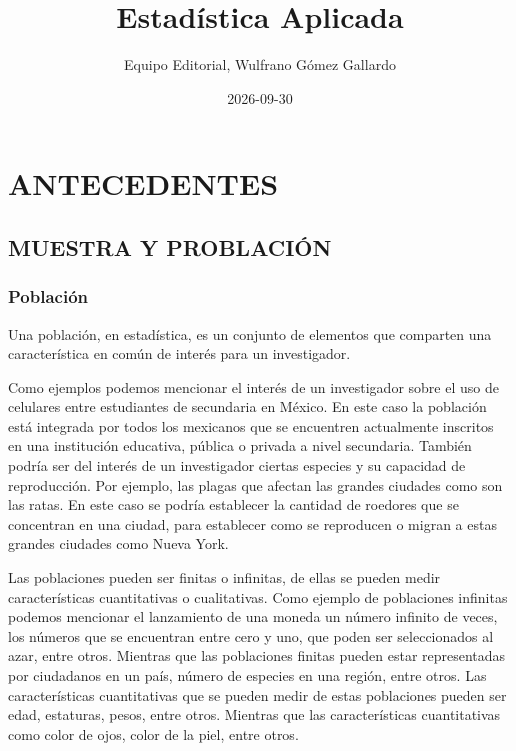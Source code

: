 \documentclass[
  oneside]{book}
\title{Estadística Aplicada}
\author{Equipo Editorial, Wulfrano Gómez Gallardo}
\date{2026-09-30}
\begin{document}
\maketitle

{
\setcounter{tocdepth}{2}
\tableofcontents
}
\chapter{ANTECEDENTES}\label{antecedentes}

\section{MUESTRA Y PROBLACIÓN}\label{muestra-y-problaciuxf3n}

\subsection{Población}\label{poblaciuxf3n}

Una población, en estadística, es un conjunto de elementos que comparten una característica en común de interés para un investigador.

Como ejemplos podemos mencionar el interés de un investigador sobre el uso de celulares entre estudiantes de secundaria en México. En este caso la población está integrada por todos los mexicanos que se encuentren actualmente inscritos en una institución educativa, pública o privada a nivel secundaria. También podría ser del interés de un investigador ciertas especies y su capacidad de reproducción. Por ejemplo, las plagas que afectan las grandes ciudades como son las ratas. En este caso se podría establecer la cantidad de roedores que se concentran en una ciudad, para establecer como se reproducen o migran a estas grandes ciudades como Nueva York.

Las poblaciones pueden ser finitas o infinitas, de ellas se pueden medir características cuantitativas o cualitativas. Como ejemplo de poblaciones infinitas podemos mencionar el lanzamiento de una moneda un número infinito de veces, los números que se encuentran entre cero y uno, que poden ser seleccionados al azar, entre otros. Mientras que las poblaciones finitas pueden estar representadas por ciudadanos en un país, número de especies en una región, entre otros. Las características cuantitativas que se pueden medir de estas poblaciones pueden ser edad, estaturas, pesos, entre otros. Mientras que las características cuantitativas como color de ojos, color de la piel, entre otros.
\end{document}
